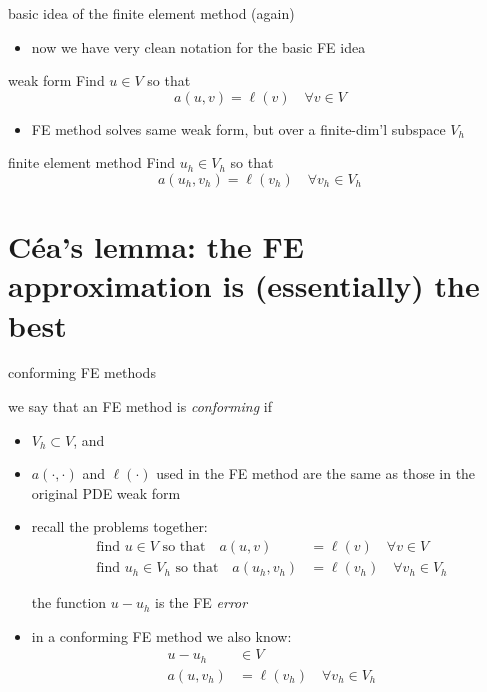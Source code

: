 \documentclass[10pt,
               svgnames,
               hyperref={colorlinks,
                         citecolor=DeepPink4,
                         linkcolor=FireBrick,
                         urlcolor=blue},
               usepdftitle=false]{beamer}
\begin{document}
\begin{frame}{basic idea of the finite element method (again)}

\begin{itemize}
\item now we have very clean notation for the basic FE idea
\end{itemize}

\begin{block}{weak form}
Find $u\in V$ so that
    $$a(u,v) = \ell(v) \quad \forall v\in V$$
\end{block}

\begin{itemize}
\item FE method solves \alert{same weak form}, but over a finite-dim'l subspace $V_h$
\end{itemize}

\begin{block}{finite element method}
Find $u_h\in V_h$ so that
    $$a(u_h,v_h) = \ell(v_h) \quad \forall v_h\in V_h$$
\end{block}
\end{frame}


\section{C\'ea's lemma: the FE approximation is (essentially) the best}

\begin{frame}{conforming FE methods}

\begin{definition}
we say that an FE method is \emph{conforming} if
\begin{itemize}
\item \alert{$V_h\subset V$}, and
\item $a(\cdot,\cdot)$ and $\ell(\cdot)$ used in the FE method \alert{are the same} as those in the original PDE weak form
\end{itemize}
\end{definition}

\begin{itemize}
\item recall the problems together:
\begin{align*}
\text{find } u \in V \text{ so that} \quad a(u,v) &= \ell(v) \quad \forall v\in V \\
\text{find } u_h \in V_h \text{ so that} \quad a(u_h,v_h) &= \ell(v_h) \quad \forall v_h\in V_h
\end{align*}

\begin{definition}
the function $u-u_h$ is the FE \emph{error}
\end{definition}

\item in a conforming FE method we also know:
\begin{align*}
u - u_h &\in V \\
a(u,v_h) &= \ell(v_h) \quad \forall v_h\in V_h
\end{align*}
\end{itemize}
\end{frame}
\end{document}
